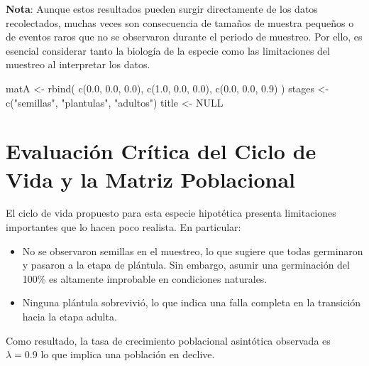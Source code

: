 \documentclass[
  12pt,
  letterpaper,
]{book}
\newenvironment{Shaded}{\begin{snugshade}}{\end{snugshade}}
\newcommand{\ConstantTok}[1]{\textcolor[rgb]{0.56,0.35,0.01}{#1}}
\newcommand{\FloatTok}[1]{\textcolor[rgb]{0.68,0.00,0.00}{#1}}
\newcommand{\FunctionTok}[1]{\textcolor[rgb]{0.28,0.35,0.67}{#1}}
\newcommand{\NormalTok}[1]{\textcolor[rgb]{0.00,0.23,0.31}{#1}}
\newcommand{\OtherTok}[1]{\textcolor[rgb]{0.00,0.23,0.31}{#1}}
\newcommand{\StringTok}[1]{\textcolor[rgb]{0.13,0.47,0.30}{#1}}
\providecommand{\tightlist}{%
  \setlength{\itemsep}{0pt}\setlength{\parskip}{0pt}}\usepackage{longtable,booktabs,array}
\begin{document}
\textbf{Nota}: Aunque estos resultados pueden surgir directamente de los
datos recolectados, muchas veces son consecuencia de tamaños de muestra
pequeños o de eventos raros que no se observaron durante el periodo de
muestreo. Por ello, es esencial considerar tanto la biología de la
especie como las limitaciones del muestreo al interpretar los datos.

\begin{Shaded}
\begin{Highlighting}[]
\NormalTok{matA }\OtherTok{\textless{}{-}} \FunctionTok{rbind}\NormalTok{(}
  \FunctionTok{c}\NormalTok{(}\FloatTok{0.0}\NormalTok{, }\FloatTok{0.0}\NormalTok{, }\FloatTok{0.0}\NormalTok{),}
  \FunctionTok{c}\NormalTok{(}\FloatTok{1.0}\NormalTok{, }\FloatTok{0.0}\NormalTok{, }\FloatTok{0.0}\NormalTok{),}
  \FunctionTok{c}\NormalTok{(}\FloatTok{0.0}\NormalTok{, }\FloatTok{0.0}\NormalTok{, }\FloatTok{0.9}\NormalTok{)}
\NormalTok{)}
\NormalTok{stages }\OtherTok{\textless{}{-}} \FunctionTok{c}\NormalTok{(}\StringTok{"semillas"}\NormalTok{, }\StringTok{"plantulas"}\NormalTok{, }\StringTok{"adultos"}\NormalTok{)}
\NormalTok{title }\OtherTok{\textless{}{-}} \ConstantTok{NULL}
\end{Highlighting}
\end{Shaded}

\section{Evaluación Crítica del Ciclo de Vida y la Matriz
Poblacional}\label{evaluaciuxf3n-cruxedtica-del-ciclo-de-vida-y-la-matriz-poblacional}

El ciclo de vida propuesto para esta especie hipotética presenta
limitaciones importantes que lo hacen poco realista. En particular:

\begin{itemize}
\tightlist
\item
  No se observaron semillas en el muestreo, lo que sugiere que todas
  germinaron y pasaron a la etapa de plántula. Sin embargo, asumir una
  germinación del 100\% es altamente improbable en condiciones
  naturales.
\item
  Ninguna plántula sobrevivió, lo que indica una falla completa en la
  transición hacia la etapa adulta.
\end{itemize}

Como resultado, la tasa de crecimiento poblacional asintótica observada
es \(\lambda = 0.9\) lo que implica una población en declive.
\end{document}
